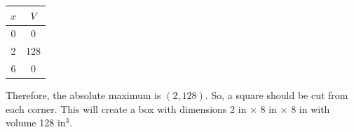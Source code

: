 \documentclass{book}
\begin{document}
\begin{Exam}
\begin{center}
\begin{tabular}{c|c}
$x$ & $V$ \\ \hline
0 & 0 \\ 
2 & 128 \\ 
6 & 0 \\ 
\end{tabular}
\end{center} Therefore, the absolute maximum is $(2,128)$. So, a \fbox{2 in  $\times$ 2 in} square should be cut from each corner. This will create a box with dimensions 2 in $\times$ 8 in $\times$ 8 in with volume 128 $\mbox{in}^3.$
\end{Exam}

\vfill
{}
\pagebreak
\end{document}
